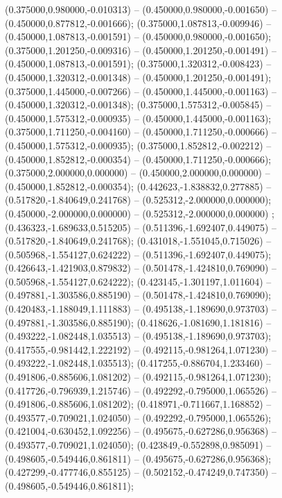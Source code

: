 (0.375000,0.980000,-0.010313) -- (0.450000,0.980000,-0.001650) -- (0.450000,0.877812,-0.001666);
 (0.375000,1.087813,-0.009946) -- (0.450000,1.087813,-0.001591) -- (0.450000,0.980000,-0.001650);
 (0.375000,1.201250,-0.009316) -- (0.450000,1.201250,-0.001491) -- (0.450000,1.087813,-0.001591);
 (0.375000,1.320312,-0.008423) -- (0.450000,1.320312,-0.001348) -- (0.450000,1.201250,-0.001491);
 (0.375000,1.445000,-0.007266) -- (0.450000,1.445000,-0.001163) -- (0.450000,1.320312,-0.001348);
 (0.375000,1.575312,-0.005845) -- (0.450000,1.575312,-0.000935) -- (0.450000,1.445000,-0.001163);
 (0.375000,1.711250,-0.004160) -- (0.450000,1.711250,-0.000666) -- (0.450000,1.575312,-0.000935);
 (0.375000,1.852812,-0.002212) -- (0.450000,1.852812,-0.000354) -- (0.450000,1.711250,-0.000666);
 (0.375000,2.000000,0.000000) -- (0.450000,2.000000,0.000000) -- (0.450000,1.852812,-0.000354);
 (0.442623,-1.838832,0.277885) -- (0.517820,-1.840649,0.241768) -- (0.525312,-2.000000,0.000000);
 (0.450000,-2.000000,0.000000) -- (0.525312,-2.000000,0.000000) ;
 (0.436323,-1.689633,0.515205) -- (0.511396,-1.692407,0.449075) -- (0.517820,-1.840649,0.241768);
 (0.431018,-1.551045,0.715026) -- (0.505968,-1.554127,0.624222) -- (0.511396,-1.692407,0.449075);
 (0.426643,-1.421903,0.879832) -- (0.501478,-1.424810,0.769090) -- (0.505968,-1.554127,0.624222);
 (0.423145,-1.301197,1.011604) -- (0.497881,-1.303586,0.885190) -- (0.501478,-1.424810,0.769090);
 (0.420483,-1.188049,1.111883) -- (0.495138,-1.189690,0.973703) -- (0.497881,-1.303586,0.885190);
 (0.418626,-1.081690,1.181816) -- (0.493222,-1.082448,1.035513) -- (0.495138,-1.189690,0.973703);
 (0.417555,-0.981442,1.222192) -- (0.492115,-0.981264,1.071230) -- (0.493222,-1.082448,1.035513);
 (0.417255,-0.886704,1.233460) -- (0.491806,-0.885606,1.081202) -- (0.492115,-0.981264,1.071230);
 (0.417726,-0.796939,1.215746) -- (0.492292,-0.795000,1.065526) -- (0.491806,-0.885606,1.081202);
 (0.418971,-0.711667,1.168852) -- (0.493577,-0.709021,1.024050) -- (0.492292,-0.795000,1.065526);
 (0.421004,-0.630452,1.092256) -- (0.495675,-0.627286,0.956368) -- (0.493577,-0.709021,1.024050);
 (0.423849,-0.552898,0.985091) -- (0.498605,-0.549446,0.861811) -- (0.495675,-0.627286,0.956368);
 (0.427299,-0.477746,0.855125) -- (0.502152,-0.474249,0.747350) -- (0.498605,-0.549446,0.861811);
